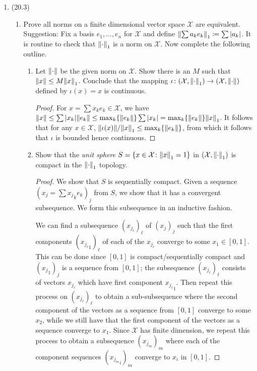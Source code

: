 \documentclass[11pt]{article}
\newcommand{\cbr}[1]{\left\{#1\right\}}
\begin{document}
\begin{enumerate}
    \item (20.3) \begin{enumerate}
      \item Prove all norms on a finite dimensional vector space $\mathcal{X}$ are equivalent. Suggestion: Fix a basis $e_1,\dots,e_n$ for $\mathcal{X}$ and define $\norm{\sum a_ke_k}_1 \coloneqq \sum\abs{a_k}$. It is routine to check that $\norm{\cdot}_1$ is a norm on $\mathcal{X}$. Now complete the following outline. \begin{enumerate}[label=(\roman*)]
        \item Let $\norm{\cdot}$ be the given norm on $\mathcal{X}$. Show there is an $M$ such that $\norm{x}\leq M\norm{x}_1$. Conclude that the mapping $\iota\colon (\mathcal{X},\norm{\cdot}_1)\to (\mathcal{X},\norm{\cdot})$ defined by $\iota(x) = x$ is continuous. \begin{proof}
          For $x = \sum x_ke_k \in \mathcal{X}$, we have $\norm{x}\leq \sum \abs{x_k}\norm{e_k}\leq \max_k\{\norm{e_k}\}\sum \abs{x_k} = \max_k\{\norm{e_k}\}\norm{x}_1$. It follows that for any $x\in\mathcal{X}$, $\norm{\iota(x)}/\norm{x}_1 \leq \max_k\{\norm{e_k}\}$, from which it follows that $\iota$ is bounded hence continuous.
        \end{proof}
        \item Show that the \textit{unit sphere} $S = \cbr{x\in \mathcal{X}\colon \norm{x}_1 = 1}$ in $(\mathcal{X},\norm{\cdot}_1)$ is compact in the $\norm{\cdot}_1$ topology. \begin{proof}
          We show that $S$ is sequentially compact. Given a sequence $(x_j = \sum {x_j}_ke_k)_j$ from $S$, we show that it has a convergent subsequence. We form this subsequence in an inductive fashion.
          
          We can find a subsequence $(x_{j_\ell})_\ell$ of $(x_j)_j$ such that the first components $({x_{j_\ell}}_1)_\ell$ of each of the $x_{j_\ell}$ converge to some $x_1\in [0,1]$. This can be done since $[0,1]$ is compact/sequentially compact and $({x_j}_1)_j$ is a sequence from $[0,1]$; the subsequence $(x_{j_\ell})_\ell$ consists of vectors $x_{j_\ell}$ which have first component ${x_{j_\ell}}_1$. Then repeat this process on $(x_{j_\ell})_\ell$ to obtain a sub-subsequence where the second component of the vectors as a sequence from $[0,1]$ converge to some $x_2$, while we still have that the first component of the vectors as a sequence converge to $x_1$. Since $\mathcal{X}$ has finite dimension, we repeat this process to obtain a subsequence $(x_{j_m})_m$ where each of the component sequences $({x_{j_m}}_i)_m$ converge to $x_i$ in $[0,1]$.


\end{proof}
\end{enumerate}
\end{enumerate}
\end{enumerate}
\end{document}
